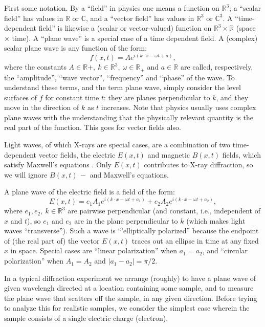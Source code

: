 \documentclass[reqno]{stml-l}
\theoremstyle{plain}
\theoremstyle{definition}
\numberwithin{equation}{chapter}
\begin{document}
First some notation. By a ``field'' in physics one means a function on $\mathbb{R}^{3}$; a ``scalar field'' has values in $\mathbb{R}$ or $\mathbb{C}$, and a ``vector field'' has values in $\mathbb{R}^{3}$ or $\mathbb{C}^{3}$. A ``time-dependent field'' is likewise a (scalar or vector-valued) function on $\mathbb{R}^{3}\times \mathbb{R}$ (space $\times$ time). A ``plane wave'' is a special case of a time dependent field. A (complex) scalar plane wave is any function of the form:
\begin{equation}
f(x, t)=Ae^{i(k\cdot x-\omega t+a)},\label{ch02:eqn02}
\end{equation}
where the constants $A\in \mathbb{R}+,\ k\in \mathbb{R}^{3},\ \omega \in \mathbb{R}_+$ and $a\in \mathbb{R}$ are called, respectively, the ``amplitude'', ``wave vector'', ``frequency'' and ``phase'' of the wave. To understand these terms, and the term plane wave, simply consider the level surfaces of $f$ for constant time $t$: they are planes perpendicular to $k$, and they move in the direction of $k$ as $t$ increases. Note that physics usually uses complex plane waves with the understanding that the physically relevant quantity is the real part of the function. This goes for vector fields also.

Light waves, of which X-rays are special cases, are a combination of two time-dependent vector fields, the electric $E(x, t)$ and magnetic $B(x, t)$ fields, which satisfy Maxwell's equations \cite{bib:EiI}. Only $E(x, t)$ contributes to X-ray diffraction, so we will ignore $B(x, t)\,-$ and Maxwell's equations.

A plane wave of the electric field is a field of the form:
\begin{equation}
E(x, t)=e_{1}A_{1}e^{i(k\cdot x-\omega t+a_{1})}+e_{2}A_{2}e^{i(k\cdot x-\omega t+a_{2})},\label{ch02:eqn2.2}
\end{equation}
where $e_{1},e_{2},\ k\in \mathbb{R}^{3}$ are pairwise perpendicular (and constant, i.e., independent of $x$ and $t$), so $e_{1}$ and $e_{2}$ are in the plane perpendicular to $k$ (which makes light waves ``transverse''). Such a wave is ``'elliptically polarized'' because the endpoint of (the real part of) the vector $E(x, t)$ traces out an ellipse in time at any fixed $x$ in space. Special cases are ``linear polarization'' when $a_{1}=a_{2}$, and ``circular polarization'' when $A_{1}=A_{2}$ and $|a_{1}-a_{2}|=\pi/2$.

In a typical diffraction experiment we arrange (roughly) to have a plane wave of given wavelengh directed at a location containing some sample, and to measure the plane wave that scatters off the sample, in any given direction. Before trying to analyze this for realistic samples, we consider the simplest case wherein the sample consists of a single electric charge (electron).
\end{document}
